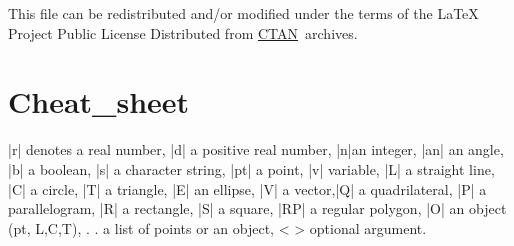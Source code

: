\documentclass[DIV         = 14,
               fontsize    = 10,
               index       = totoc,
               twoside,
               cadre,
               headings    = small
               ]{tkz-doc}
\begin{document}
This file can be redistributed and/or modified under the terms of the \LaTeX{} 
Project Public License Distributed from \href{http://www.ctan.org/}{CTAN}\  archives.

\clearpage
\tableofcontents

\clearpage
\newpage























\clearpage\newpage
\small\printindex

\newpage
\section{Cheat\_sheet} %
\label{sec:cheat_sheet}

|r| denotes a real number, |d| a positive real number, |n|an integer, |an| an angle, |b| a boolean, |s| a character string, |pt| a point, |v| variable, |L| a straight line, |C| a circle, |T| a triangle, |E| an ellipse, |V| a vector,|Q| a quadrilateral, |P| a parallelogram, |R| a rectangle, |S| a square, |RP| a regular polygon, |O| an object (pt, L,C,T), . . a list of points or an object, < > optional argument. 
\end{document}
